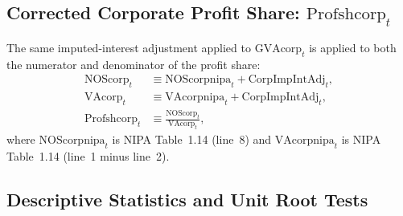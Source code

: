 \subsection{Corrected Corporate Profit Share: \texorpdfstring{$\text{Profshcorp}_t$}{Profshcorp}}
\label{subsec:app_profsh}

The same imputed-interest adjustment applied to $\text{GVAcorp}_t$ is applied to both the numerator and denominator of the profit share:
%
\begin{align}
\text{NOScorp}_t &\equiv \text{NOScorpnipa}_t + \text{CorpImpIntAdj}_t, \label{eq:app_nos} \\
\text{VAcorp}_t &\equiv \text{VAcorpnipa}_t + \text{CorpImpIntAdj}_t, \label{eq:app_va} \\
\text{Profshcorp}_t &\equiv \frac{\text{NOScorp}_t}{\text{VAcorp}_t}, \label{eq:app_profshcorp}
\end{align}
%
where $\text{NOScorpnipa}_t$ is NIPA Table~1.14 (line~8) and $\text{VAcorpnipa}_t$ is NIPA Table~1.14 (line~1 minus line~2).

\subsection{Descriptive Statistics and Unit Root Tests}
\label{subsec:app_desc_stats}

